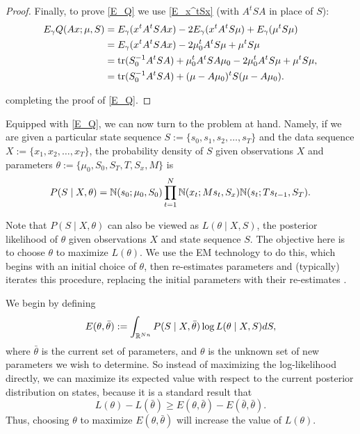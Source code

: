 \documentclass[12pt,leqno]{article}
\begin{document}
\begin{proof}
    Finally, to prove \eqref{E_Q} we  use \eqref{E_x^tSx} (with $A^tSA$ in place of $S$):
      \begin{align*}
        E_{\gamma}Q(Ax;\mu,S) &= E_{\gamma}(x^tA^tSAx) - 2E_{\gamma}(x^tA^tS\mu) + E_{\gamma}(\mu^tS\mu) \\
        &= E_{\gamma}(x^tA^tSAx) - 2\mu_0^tA^tS\mu + \mu^tS\mu\\
        &= \tr(S_0^{-1}A^tSA) + \mu_0^tA^tSA\mu_0 - 2\mu_0^tA^tS\mu + \mu^tS\mu,\\
        &= \tr(S_0^{-1}A^tSA) + (\mu-A\mu_0)^tS(\mu- A\mu_0). %
      \end{align*}

completing the proof of \eqref{E_Q}.
  \end{proof}
  
Equipped with \eqref{E_Q}, we can now turn to the problem at hand.  Namely, if we are given a particular
state sequence $S := \{s_0,s_1,s_2,\dots,s_T\}$ and the data sequence $X := \{x_1,x_2,\dots,x_T\}$,
the probability density of $S$ given observations $X$ and  parameters $\theta := \{\mu_0,S_0,S_T,T,S_x,M\}$ is
\begin{equation} \label{density}
P(S\mid X,\theta) = {\mathbb N}(s_0;\mu_0,S_0)\prod_{t=1}^N{\mathbb N}(x_t;Ms_t,S_x){\mathbb N}(s_t;Ts_{t-1},S_T).
\end{equation}

Note that $P(S\mid X, \theta)$ can also be viewed as  $L(\theta\mid X,S)$, the posterior likelihood of $\theta$
given observations $X$ and state sequence $S$.  The objective here is to choose $\theta$ to maximize $L(\theta)$.
We use the EM technology to do this, which begins with an initial choice of $\theta$, then re-estimates
parameters and (typically) iterates this procedure, replacing the initial parameters with their re-estimates .

We begin by defining 
$$
E(\theta,\bar{\theta}) := \int_{{\mathbb R}^{Nn}}P(S\mid X,\bar{\theta})\log{L(\theta\mid X,S)}dS,
$$
where $\bar{\theta}$ is the current set of parameters, and $\theta$ is the unknown set of new parameters
we wish to determine. So instead of maximizing the log-likelihood directly, we can maximize its expected
value with respect to the current posterior distribution on states, because it is a standard result \cite{Dempster}
that
$$
L(\theta) - L(\bar{\theta}) \ge E(\theta,\bar{\theta}) - E(\bar{\theta},\bar{\theta}).
$$
Thus, choosing $\theta$ to maximize $E(\theta,\bar{\theta})$ will increase the value of $L(\theta)$.
\end{document}
